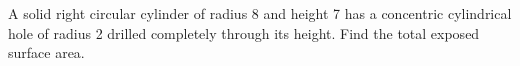 A solid right circular cylinder of radius 8 and height 7 has a concentric cylindrical hole of radius 2 drilled completely through its height. Find the total exposed surface area.
